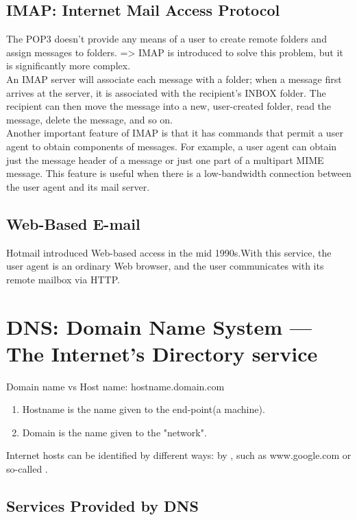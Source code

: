 \subsection{IMAP: Internet Mail Access Protocol}

\hf
The POP3 doesn't provide any means of a user to create remote folders and assign
messages to folders. => IMAP is introduced to solve this problem, but it is significantly
more complex.\\

An IMAP server will associate each message with a folder; when a message first
arrives at the server, it is associated with the recipient’s INBOX folder. The recipient
can then move the message into a new, user-created folder, read the message, delete
the message, and so on.\\

Another important feature of IMAP is that it has commands that permit a user
agent to obtain components of messages. For example, a user agent can obtain just
the message header of a message or just one part of a multipart MIME message.
This feature is useful when there is a low-bandwidth connection between the user agent and its mail server.


\subsection{Web-Based E-mail}

\hf
Hotmail introduced Web-based access in the mid 1990s.With this service, the user agent is an ordinary Web browser,
and the user communicates with its remote mailbox via HTTP.


\newpage
\section{DNS: Domain Name System — The Internet's Directory service}

Domain name vs Host name: hostname.domain.com
\begin{enumerate}
    \item Hostname is the name given to the end-point(a machine).
    \item Domain is the name given to the "network".
\end{enumerate}

\hf
Internet hosts can be identified by different ways: by , such as
www.google.com or so-called .


\subsection{Services Provided by DNS}

